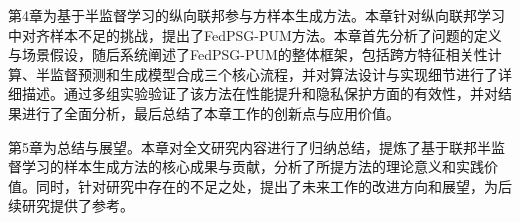 第4章为基于半监督学习的纵向联邦参与方样本生成方法。本章针对纵向联邦学习中对齐样本不足的挑战，提出了FedPSG-PUM方法。本章首先分析了问题的定义与场景假设，随后系统阐述了FedPSG-PUM的整体框架，包括跨方特征相关性计算、半监督预测和生成模型合成三个核心流程，并对算法设计与实现细节进行了详细描述。通过多组实验验证了该方法在性能提升和隐私保护方面的有效性，并对结果进行了全面分析，最后总结了本章工作的创新点与应用价值。

第5章为总结与展望。本章对全文研究内容进行了归纳总结，提炼了基于联邦半监督学习的样本生成方法的核心成果与贡献，分析了所提方法的理论意义和实践价值。同时，针对研究中存在的不足之处，提出了未来工作的改进方向和展望，为后续研究提供了参考。
\clearpage


